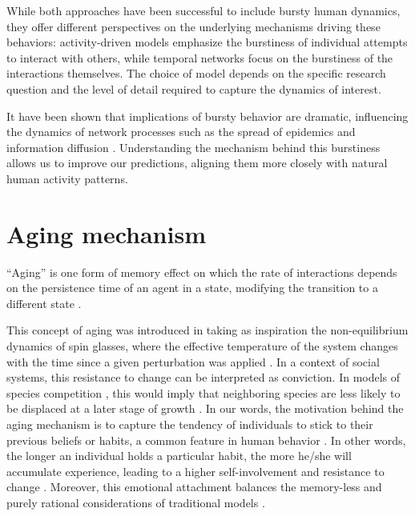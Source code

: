 While both approaches have been successful to include bursty human dynamics, they offer different perspectives on the underlying mechanisms driving these behaviors: activity-driven models emphasize the burstiness of individual attempts to interact with others, while temporal networks focus on the burstiness of the interactions themselves. The choice of model depends on the specific research question and the level of detail required to capture the dynamics of interest.

It have been shown that implications of bursty behavior are dramatic, influencing the dynamics of network processes such as the spread of epidemics and information diffusion \cite{Rocha2013Bursts, Wang2009Viruses}. Understanding the mechanism behind this burstiness allows us to improve our predictions, aligning them more closely with natural human activity patterns.

\section{\label{sec:Aging mechanism} Aging mechanism}

``Aging'' is one form of memory effect on which the rate of interactions depends on the persistence time of an agent in a state, modifying the transition to a different state \cite{fernandez-gracia-2011,perez-2016,boguna-2014}. 

This concept of aging was introduced in \cite{Stark2008} taking as inspiration the non-equilibrium dynamics of spin glasses, where the effective temperature
of the system changes with the time since a given perturbation was applied \cite{cugliandolo1993analytical}. In a context of social systems, this resistance to change can be interpreted as conviction. In models of species competition \cite{ravasz2004spreading}, this would imply that neighboring species are less likely to be displaced at a later stage of growth \cite{Stark2008}. In our words, the motivation behind the aging mechanism is to capture the tendency of individuals to stick to their previous beliefs or habits, a common feature in human behavior \cite{granovetter-1973}. In other words, the longer an individual holds a particular habit, the more he/she will accumulate experience, leading to a higher self-involvement and resistance to change \cite{lejarraga2011let}. Moreover, this emotional attachment balances the memory-less and purely rational considerations of traditional models \cite{granovetter-1985}.

